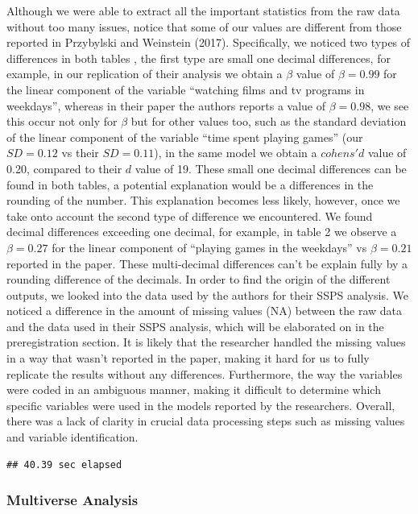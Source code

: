 \documentclass[floatsintext,man]{apa6}
\theoremstyle{definition}
\theoremstyle{definition}
\theoremstyle{definition}
\theoremstyle{remark}
\begin{document}
Although we were able to extract all the important statistics from the
raw data without too many issues, notice that some of our values are
different from those reported in Przybylski and Weinstein (2017).
Specifically, we noticed two types of differences in both tables , the
first type are small one decimal differences, for example, in our
replication of their analysis we obtain a \(\beta\) value of
\(\beta =0.99\) for the linear component of the variable
\enquote{watching films and tv programs in weekdays}, whereas in their
paper the authors reports a value of \(\beta=0.98\), we see this occur
not only for \(\beta\) but for other values too, such as the standard
deviation of the linear component of the variable \enquote{time spent
playing games} (our \(SD =0.12\) vs their \(SD =0.11\)), in the same
model we obtain a \(cohens'd\) value of 0.20, compared to their \(d\)
value of 19. These small one decimal differences can be found in both
tables, a potential explanation would be a differences in the rounding
of the number. This explanation becomes less likely, however, once we
take onto account the second type of difference we encountered. We found
decimal differences exceeding one decimal, for example, in table 2 we
observe a \(\beta =0.27\) for the linear component of \enquote{playing
games in the weekdays} vs \(\beta =0.21\) reported in the paper. These
multi-decimal differences can't be explain fully by a rounding
difference of the decimals. In order to find the origin of the different
outputs, we looked into the data used by the authors for their SSPS
analysis. We noticed a difference in the amount of missing values (NA)
between the raw data and the data used in their SSPS analysis, which
will be elaborated on in the preregistration section. It is likely that
the researcher handled the missing values in a way that wasn't reported
in the paper, making it hard for us to fully replicate the results
without any differences. Furthermore, the way the variables were coded
in an ambiguous manner, making it difficult to determine which specific
variables were used in the models reported by the researchers. Overall,
there was a lack of clarity in crucial data processing steps such as
missing values and variable identification.

\begin{verbatim}
## 40.39 sec elapsed
\end{verbatim}

\hypertarget{multiverse-analysis}{%
\subsubsection{Multiverse Analysis}\label{multiverse-analysis}}
\end{document}
